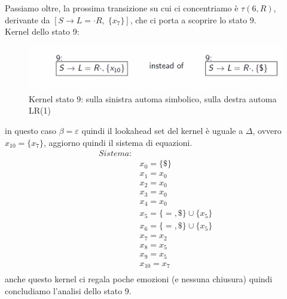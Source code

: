 \documentclass[class=book, crop=false, oneside, 12pt]{standalone}
\begin{document}
Passiamo oltre, la prossima transizione su cui ci concentriamo è \(\tau(6, R)\), derivante da \([S \to L = \cdot R, \; \{x_7\}]\), che ci porta a scoprire lo stato 9.
\\
Kernel dello stato 9:
\begin{figure}
    \centering
    \includegraphics[width=.7\textwidth]{ex_automa_simbolico-kernel_s9.png}
    \caption{Kernel stato 9: sulla sinistra automa simbolico, sulla destra automa LR(1)}
\end{figure}
in questo caso  \(\beta = \varepsilon\) quindi il lookahead set del kernel è uguale a \(\Delta\), ovvero \(x_{10} = \{x_7\}\), aggiorno quindi il sistema di equazioni.
\begin{align*}
    Sistema:& \\
            & x_0 = \{\$\} \\
            & x_1 = x_0 \\
            & x_2 = x_0 \\
            & x_3 = x_0 \\
            & x_4 = x_0 \\
            & x_5 = \{=, \$\} \cup \{x_5\} \\
            & x_6 = \{=, \$\} \cup \{x_5\} \\
            & x_7 = x_2 \\
            & x_8 = x_5 \\
            & x_9 = x_5 \\
            & x_{10} = x_7 \\
\end{align*}
anche questo kernel ci regala poche emozioni (e nessuna chiusura) quindi concludiamo l'analisi dello stato 9.
\end{document}
